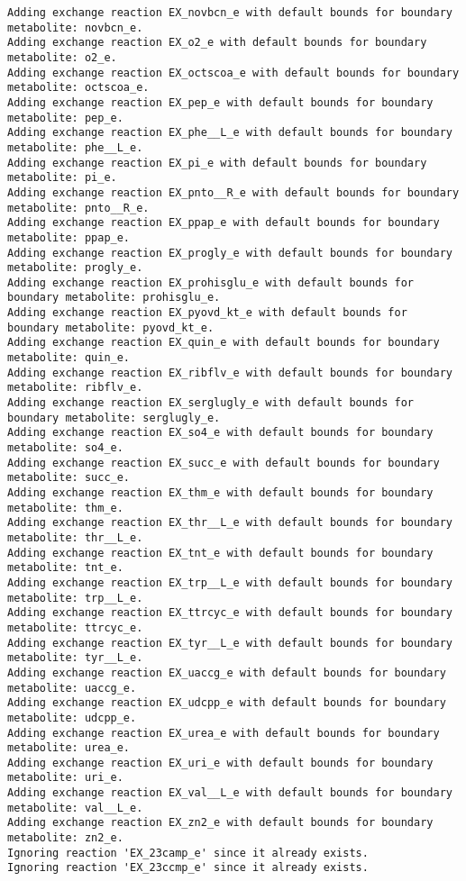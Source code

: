 \documentclass[
  letterpaper,
  DIV=11,
  numbers=noendperiod]{scrartcl}
\begin{document}
\begin{verbatim}
Adding exchange reaction EX_novbcn_e with default bounds for boundary metabolite: novbcn_e.
Adding exchange reaction EX_o2_e with default bounds for boundary metabolite: o2_e.
Adding exchange reaction EX_octscoa_e with default bounds for boundary metabolite: octscoa_e.
Adding exchange reaction EX_pep_e with default bounds for boundary metabolite: pep_e.
Adding exchange reaction EX_phe__L_e with default bounds for boundary metabolite: phe__L_e.
Adding exchange reaction EX_pi_e with default bounds for boundary metabolite: pi_e.
Adding exchange reaction EX_pnto__R_e with default bounds for boundary metabolite: pnto__R_e.
Adding exchange reaction EX_ppap_e with default bounds for boundary metabolite: ppap_e.
Adding exchange reaction EX_progly_e with default bounds for boundary metabolite: progly_e.
Adding exchange reaction EX_prohisglu_e with default bounds for boundary metabolite: prohisglu_e.
Adding exchange reaction EX_pyovd_kt_e with default bounds for boundary metabolite: pyovd_kt_e.
Adding exchange reaction EX_quin_e with default bounds for boundary metabolite: quin_e.
Adding exchange reaction EX_ribflv_e with default bounds for boundary metabolite: ribflv_e.
Adding exchange reaction EX_serglugly_e with default bounds for boundary metabolite: serglugly_e.
Adding exchange reaction EX_so4_e with default bounds for boundary metabolite: so4_e.
Adding exchange reaction EX_succ_e with default bounds for boundary metabolite: succ_e.
Adding exchange reaction EX_thm_e with default bounds for boundary metabolite: thm_e.
Adding exchange reaction EX_thr__L_e with default bounds for boundary metabolite: thr__L_e.
Adding exchange reaction EX_tnt_e with default bounds for boundary metabolite: tnt_e.
Adding exchange reaction EX_trp__L_e with default bounds for boundary metabolite: trp__L_e.
Adding exchange reaction EX_ttrcyc_e with default bounds for boundary metabolite: ttrcyc_e.
Adding exchange reaction EX_tyr__L_e with default bounds for boundary metabolite: tyr__L_e.
Adding exchange reaction EX_uaccg_e with default bounds for boundary metabolite: uaccg_e.
Adding exchange reaction EX_udcpp_e with default bounds for boundary metabolite: udcpp_e.
Adding exchange reaction EX_urea_e with default bounds for boundary metabolite: urea_e.
Adding exchange reaction EX_uri_e with default bounds for boundary metabolite: uri_e.
Adding exchange reaction EX_val__L_e with default bounds for boundary metabolite: val__L_e.
Adding exchange reaction EX_zn2_e with default bounds for boundary metabolite: zn2_e.
Ignoring reaction 'EX_23camp_e' since it already exists.
Ignoring reaction 'EX_23ccmp_e' since it already exists.

\end{verbatim}
\end{document}
